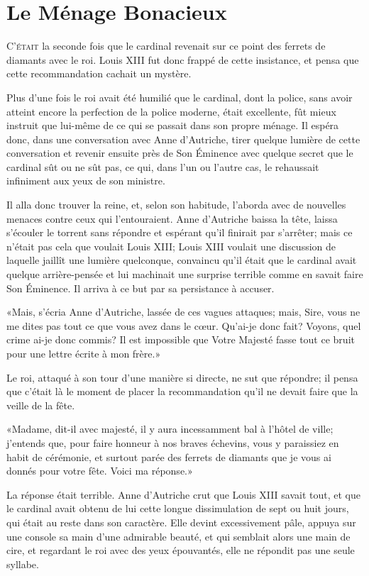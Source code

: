 
\chapter{Le Ménage Bonacieux} 
	
	\lettrine{C}{'était} la seconde fois que le cardinal revenait sur ce point des ferrets de diamants avec le roi. Louis XIII fut donc frappé de cette insistance, et pensa que cette recommandation cachait un mystère. 

Plus d'une fois le roi avait été humilié que le cardinal, dont la police, sans avoir atteint encore la perfection de la police moderne, était excellente, fût mieux instruit que lui-même de ce qui se passait dans son propre ménage. Il espéra donc, dans une conversation avec Anne d'Autriche, tirer quelque lumière de cette conversation et revenir ensuite près de Son Éminence avec quelque secret que le cardinal sût ou ne sût pas, ce qui, dans l'un ou l'autre cas, le rehaussait infiniment aux yeux de son ministre. 

Il alla donc trouver la reine, et, selon son habitude, l'aborda avec de nouvelles menaces contre ceux qui l'entouraient. Anne d'Autriche baissa la tête, laissa s'écouler le torrent sans répondre et espérant qu'il finirait par s'arrêter; mais ce n'était pas cela que voulait Louis XIII; Louis XIII voulait une discussion de laquelle jaillît une lumière quelconque, convaincu qu'il était que le cardinal avait quelque arrière-pensée et lui machinait une surprise terrible comme en savait faire Son Éminence. Il arriva à ce but par sa persistance à accuser. 

«Mais, s'écria Anne d'Autriche, lassée de ces vagues attaques; mais, Sire, vous ne me dites pas tout ce que vous avez dans le cœur. Qu'ai-je donc fait? Voyons, quel crime ai-je donc commis? Il est impossible que Votre Majesté fasse tout ce bruit pour une lettre écrite à mon frère.» 

Le roi, attaqué à son tour d'une manière si directe, ne sut que répondre; il pensa que c'était là le moment de placer la recommandation qu'il ne devait faire que la veille de la fête. 

«Madame, dit-il avec majesté, il y aura incessamment bal à l'hôtel de ville; j'entends que, pour faire honneur à nos braves échevins, vous y paraissiez en habit de cérémonie, et surtout parée des ferrets de diamants que je vous ai donnés pour votre fête. Voici ma réponse.» 

La réponse était terrible. Anne d'Autriche crut que Louis XIII savait tout, et que le cardinal avait obtenu de lui cette longue dissimulation de sept ou huit jours, qui était au reste dans son caractère. Elle devint excessivement pâle, appuya sur une console sa main d'une admirable beauté, et qui semblait alors une main de cire, et regardant le roi avec des yeux épouvantés, elle ne répondit pas une seule syllabe. 

